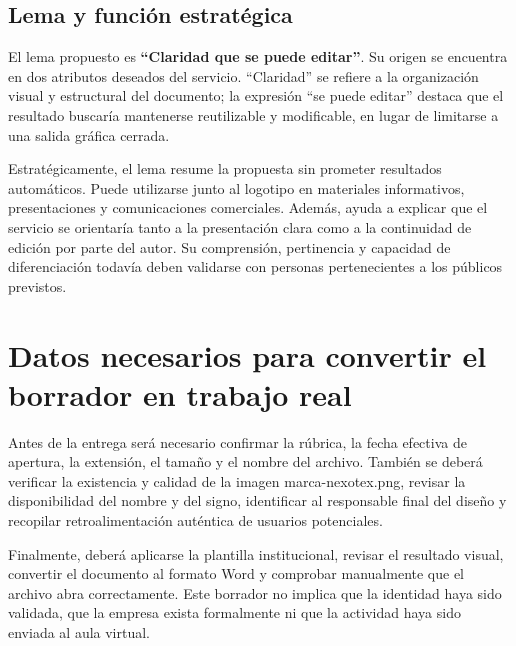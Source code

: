 \documentclass[12pt,letterpaper,oneside]{article}
\begin{document}
\subsection{Lema y función estratégica}

El lema propuesto es \textbf{``Claridad que se puede editar''}. Su origen se encuentra en dos atributos deseados del servicio. ``Claridad'' se refiere a la organización visual y estructural del documento; la expresión ``se puede editar'' destaca que el resultado buscaría mantenerse reutilizable y modificable, en lugar de limitarse a una salida gráfica cerrada.

Estratégicamente, el lema resume la propuesta sin prometer resultados automáticos. Puede utilizarse junto al logotipo en materiales informativos, presentaciones y comunicaciones comerciales. Además, ayuda a explicar que el servicio se orientaría tanto a la presentación clara como a la continuidad de edición por parte del autor. Su comprensión, pertinencia y capacidad de diferenciación todavía deben validarse con personas pertenecientes a los públicos previstos.

\section{Datos necesarios para convertir el borrador en trabajo real}

Antes de la entrega será necesario confirmar la rúbrica, la fecha efectiva de apertura, la extensión, el tamaño y el nombre del archivo. También se deberá verificar la existencia y calidad de la imagen marca-nexotex.png, revisar la disponibilidad del nombre y del signo, identificar al responsable final del diseño y recopilar retroalimentación auténtica de usuarios potenciales.

Finalmente, deberá aplicarse la plantilla institucional, revisar el resultado visual, convertir el documento al formato Word y comprobar manualmente que el archivo abra correctamente. Este borrador no implica que la identidad haya sido validada, que la empresa exista formalmente ni que la actividad haya sido enviada al aula virtual.
\clearpage
\printbibliography[title={Fuentes de consulta}]
\end{document}
